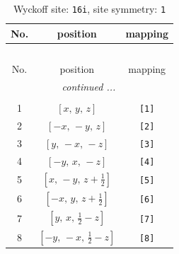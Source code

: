 \documentclass[fleqn,8pt]{jsarticle}
\begin{document}
\renewcommand{\arraystretch}{1.2}
\begin{longtable}{ccc}
\caption{Wyckoff site: {\tt 16i}, site symmetry: {\tt 1}}
 \\
 \hline \hline
No. & position & mapping \\ \hline \endfirsthead

\multicolumn{2}{l}{\tablename\ \thetable{}} \\
 \hline \hline
No. & position & mapping \\ \hline \endhead

 \hline \hline
\multicolumn{2}{r}{\footnotesize\it continued ...} \\ \endfoot

 \hline \hline
\multicolumn{2}{r}{} \\ \endlastfoot

1 & $\left[ x,\, y,\, z \right]$ & {\tt [1]} \\ \hline
2 & $\left[ - x,\, - y,\, z \right]$ & {\tt [2]} \\ \hline
3 & $\left[ y,\, - x,\, - z \right]$ & {\tt [3]} \\ \hline
4 & $\left[ - y,\, x,\, - z \right]$ & {\tt [4]} \\ \hline
5 & $\left[ x,\, - y,\, z + \frac{1}{2} \right]$ & {\tt [5]} \\ \hline
6 & $\left[ - x,\, y,\, z + \frac{1}{2} \right]$ & {\tt [6]} \\ \hline
7 & $\left[ y,\, x,\, \frac{1}{2} - z \right]$ & {\tt [7]} \\ \hline
8 & $\left[ - y,\, - x,\, \frac{1}{2} - z \right]$ & {\tt [8]} \\
\end{longtable}
\end{document}
